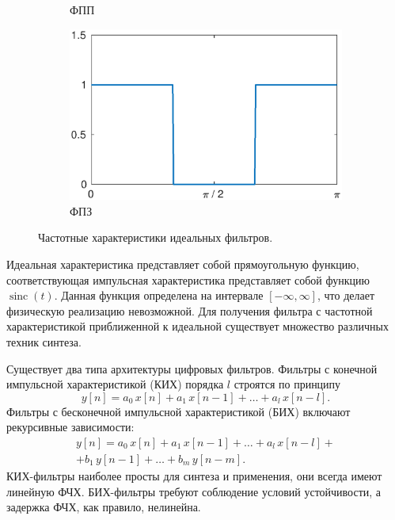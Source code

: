 \documentclass[a4paper,14pt]{extarticle}
\DeclareMathOperator{\sinc}{sinc}
\begin{document}
\begin{figure}[H]
\begin{subfigure}[b]{0.49\textwidth}
\captionsetup{justification=centering,margin=1cm}
\caption{ФПП}
\end{subfigure}
\begin{subfigure}[b]{0.49\textwidth}
\includegraphics[width=1\textwidth]{bsf.eps}
\captionsetup{justification=centering,margin=1cm}
\caption{ФПЗ}
\end{subfigure}
\caption{Частотные характеристики идеальных фильтров.}
\label{fs}
\end{figure}

Идеальная характеристика представляет собой прямоугольную функцию, соответствующая импульсная характеристика представляет собой функцию $\sinc(t)$. Данная функция определена на интервале $[-\infty, \infty]$, что делает физическую реализацию невозможной. Для получения фильтра с частотной характеристикой приближенной к идеальной существует множество различных техник синтеза. 

Существует два типа архитектуры цифровых фильтров. Фильтры с конечной импульсной характеристикой (КИХ) порядка $l$ строятся по принципу 
\begin{equation*}
y[n] = a_0\,x[n] + a_1\,x[n-1] + \dots + a_l\,x[n-l].
\end{equation*} 
Фильтры с бесконечной импульсной характеристикой (БИХ) включают рекурсивные зависимости:
\begin{equation*}
\begin{split}
y[n] = a_0\,x[n] + a_1\,x[n-1] + \dots + a_l\,x[n-l] + \\ + b_1\,y[n-1] + \dots + b_m\,y[n-m].
\end{split}
\end{equation*} 
КИХ-фильтры наиболее просты для синтеза и применения, они всегда имеют линейную ФЧХ. БИХ-фильтры требуют соблюдение условий устойчивости, а задержка ФЧХ, как правило, нелинейна.
\end{document}
